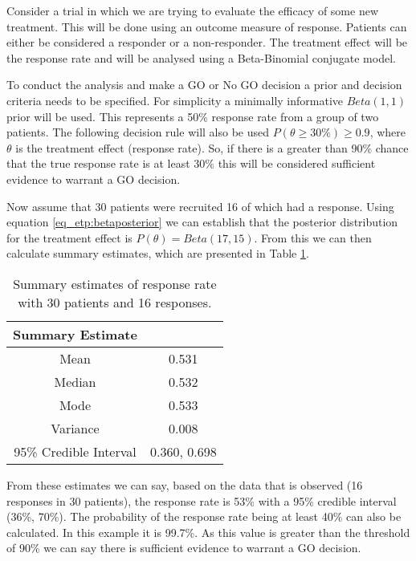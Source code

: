 Consider a trial in which we are trying to evaluate the efficacy of some new treatment. This will be done using an outcome measure of response. Patients can either be considered a responder or a non-responder. The treatment effect will be the response rate and will be analysed using a Beta-Binomial conjugate model. 

To conduct the analysis and make a GO or No GO decision a prior and decision criteria needs to be specified. For simplicity a minimally informative $Beta(1,1)$ prior will be used. This represents a 50\% response rate from a group of two patients. The following decision rule will also be used $P(\theta  \geq 30\%) \geq 0.9$, where $\theta$ is the treatment effect (response rate). So, if there is a greater than  90\% chance that the true response rate is at least 30\% this will be considered sufficient evidence to warrant a GO decision. 

Now assume that 30 patients were recruited 16 of which had a response. Using equation \ref{eq_etp:betaposterior} we can establish that the posterior distribution for the treatment effect is $P(\theta) = Beta(17, 15)$. From this we can then calculate summary estimates, which are presented in Table \ref{tab_etp:bb_sum_est}.

\begin{table}[H]
	\centering
	\caption{Summary estimates of response rate with 30 patients and 16 responses. }
	\label{tab_etp:bb_sum_est}
	\begin{tabular}{cc}
		\hline
		\textbf{Summary Estimate}                   &              \\ \hline
		\multicolumn{1}{c|}{Mean}                   & 0.531        \\
		\multicolumn{1}{c|}{Median}                 & 0.532       \\
		\multicolumn{1}{c|}{Mode}                   & 0.533          \\
		\multicolumn{1}{c|}{Variance}               & 0.008        \\
		\multicolumn{1}{c|}{95\% Credible Interval} & 0.360, 0.698 \\ \hline
	\end{tabular}
\end{table}

From these estimates we can say, based on the data that is observed (16 responses in 30 patients), the response rate is 53\% with a 95\% credible interval (36\%, 70\%). The probability of the response rate being at least 40\% can also be calculated. In this example it is 99.7\%. As this value is greater than the threshold of 90\%  we can say there is sufficient evidence to warrant a GO decision.


